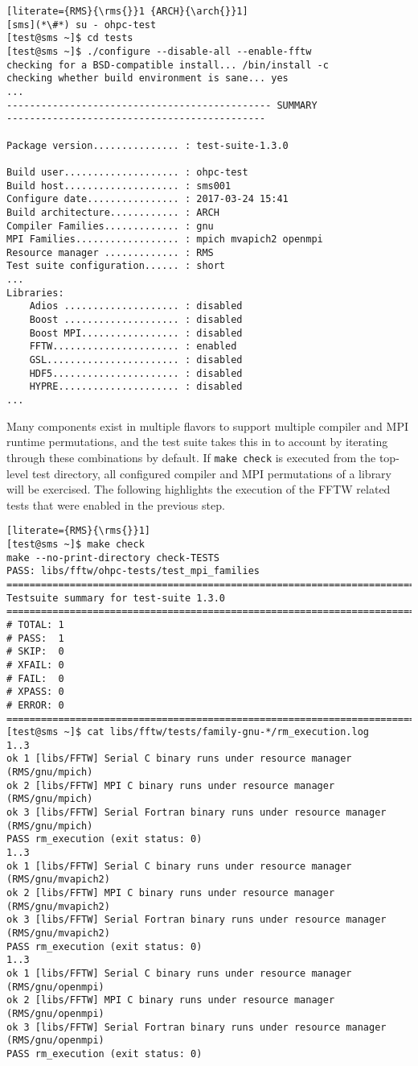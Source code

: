 \begin{lstlisting}[literate={RMS}{\rms{}}1 {ARCH}{\arch{}}1]
[sms](*\#*) su - ohpc-test
[test@sms ~]$ cd tests
[test@sms ~]$ ./configure --disable-all --enable-fftw
checking for a BSD-compatible install... /bin/install -c
checking whether build environment is sane... yes
...
---------------------------------------------- SUMMARY
---------------------------------------------

Package version............... : test-suite-1.3.0

Build user.................... : ohpc-test
Build host.................... : sms001
Configure date................ : 2017-03-24 15:41
Build architecture............ : ARCH
Compiler Families............. : gnu
MPI Families.................. : mpich mvapich2 openmpi
Resource manager ............. : RMS
Test suite configuration...... : short
...
Libraries:
    Adios .................... : disabled
    Boost .................... : disabled
    Boost MPI................. : disabled
    FFTW...................... : enabled
    GSL....................... : disabled
    HDF5...................... : disabled
    HYPRE..................... : disabled
...
\end{lstlisting}

Many \OHPC{} components exist in multiple flavors to support multiple compiler
and MPI runtime permutations, and the test suite takes this in to account by
iterating through these combinations by default. If \texttt{make check} is
executed from the top-level test directory, all configured compiler and MPI
permutations of a library will be exercised. The following highlights the
execution of the FFTW related tests that were enabled in the previous step.

\begin{lstlisting}[literate={RMS}{\rms{}}1]
[test@sms ~]$ make check
make --no-print-directory check-TESTS
PASS: libs/fftw/ohpc-tests/test_mpi_families
============================================================================
Testsuite summary for test-suite 1.3.0
============================================================================
# TOTAL: 1
# PASS:  1
# SKIP:  0
# XFAIL: 0
# FAIL:  0
# XPASS: 0
# ERROR: 0
============================================================================
[test@sms ~]$ cat libs/fftw/tests/family-gnu-*/rm_execution.log 
1..3
ok 1 [libs/FFTW] Serial C binary runs under resource manager (RMS/gnu/mpich)
ok 2 [libs/FFTW] MPI C binary runs under resource manager (RMS/gnu/mpich)
ok 3 [libs/FFTW] Serial Fortran binary runs under resource manager (RMS/gnu/mpich)
PASS rm_execution (exit status: 0)
1..3
ok 1 [libs/FFTW] Serial C binary runs under resource manager (RMS/gnu/mvapich2)
ok 2 [libs/FFTW] MPI C binary runs under resource manager (RMS/gnu/mvapich2)
ok 3 [libs/FFTW] Serial Fortran binary runs under resource manager (RMS/gnu/mvapich2)
PASS rm_execution (exit status: 0)
1..3
ok 1 [libs/FFTW] Serial C binary runs under resource manager (RMS/gnu/openmpi)
ok 2 [libs/FFTW] MPI C binary runs under resource manager (RMS/gnu/openmpi)
ok 3 [libs/FFTW] Serial Fortran binary runs under resource manager (RMS/gnu/openmpi)
PASS rm_execution (exit status: 0)
\end{lstlisting}
